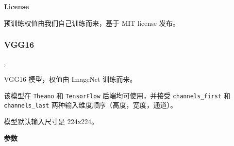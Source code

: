 \textbf{License}\label{license}

预训练权值由我们自己训练而来，基于 MIT license 发布。



\subsubsection{VGG16}\label{vgg16}

\begin{Shaded}
\begin{Highlighting}[]
\OperatorTok{=}\OperatorTok{=}, \\
\hspace{3cm}\OperatorTok{=}\OperatorTok{=}\OperatorTok{=}\OperatorTok{=}\NormalTok{)}
\end{Highlighting}
\end{Shaded}

VGG16 模型，权值由 ImageNet 训练而来。

该模型在 \texttt{Theano} 和 \texttt{TensorFlow} 后端均可使用，并接受
\texttt{channels\_first} 和 \texttt{channels\_last}
两种输入维度顺序（高度，宽度，通道）。

模型默认输入尺寸是 224x224。

\textbf{参数}\label{ux53c2ux6570-1}

